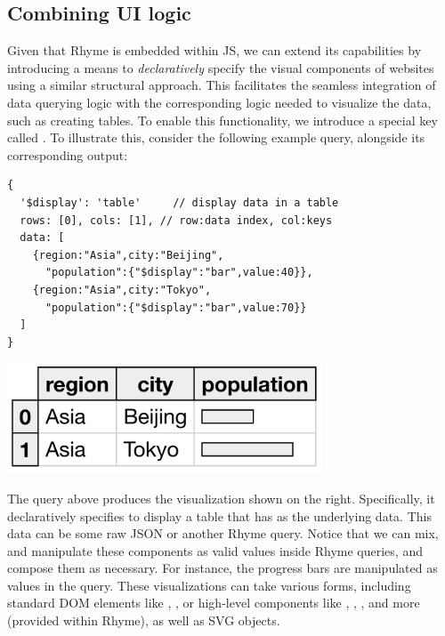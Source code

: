 \documentclass[runningheads]{llncs}
\newcommand{\lang}{Rhyme}
\begin{document}

\subsection{Combining UI logic}
Given that \lang{} is embedded within JS, we can extend its capabilities by introducing
a means to \emph{declaratively} specify the visual components of websites using a similar
structural approach.
This facilitates the seamless integration of data querying logic with the corresponding
logic needed to visualize the data, such as creating tables.
To enable this functionality, we introduce a special key called .
To illustrate this, consider the following example query, alongside its corresponding output:

\hspace{-18pt}
\begin{minipage}{0.6\textwidth}
\begin{lstlisting}[style=JavaScript,columns=flexible]
{
  '$display': 'table'     // display data in a table
  rows: [0], cols: [1], // row:data index, col:keys
  data: [
    {region:"Asia",city:"Beijing",
      "population":{"$display":"bar",value:40}},
    {region:"Asia",city:"Tokyo",
      "population":{"$display":"bar",value:70}}
  ]
}
\end{lstlisting}
\end{minipage}%
\begin{minipage}{0.4\textwidth}
\includegraphics[width=0.7\textwidth]{images/small_table.png}
\end{minipage}

The query above produces the visualization shown on the right.
Specifically, it declaratively specifies to display a table that
has  as the underlying data.
This data can be some raw JSON or another \lang{} query.
Notice that we can mix, and manipulate these components as valid
values inside \lang{} queries, and compose them as necessary.
For instance, the progress bars are manipulated as values in the query.
These visualizations can take various forms, including standard DOM elements
like , , or high-level components like
, , , and more (provided within \lang{}),
as well as SVG objects.
\end{document}
